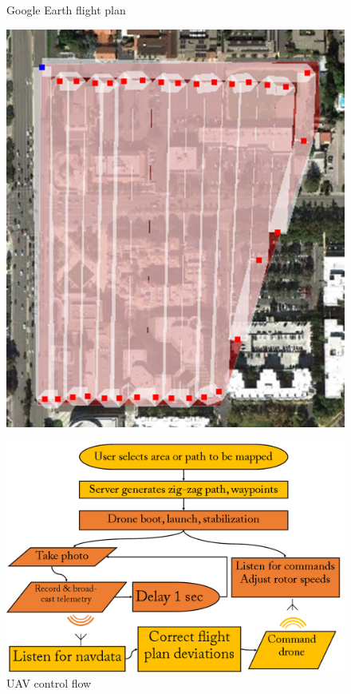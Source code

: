 \begin{figure}[h!]
	\begin{minipage}{.4\textwidth}
		\caption{Google Earth flight plan}
		\label{fig:FlightPlan}
		\centering \includegraphics[width=0.9\linewidth]{illustrations/flight_path}
	\end{minipage}%
	\begin{minipage}{.6\textwidth}
		\caption{UAV control flow}
		\label{fig:DroneControl}
		\centering \includegraphics[width=0.9\linewidth]{illustrations/drone_chart}
	\end{minipage}
\end{figure}

